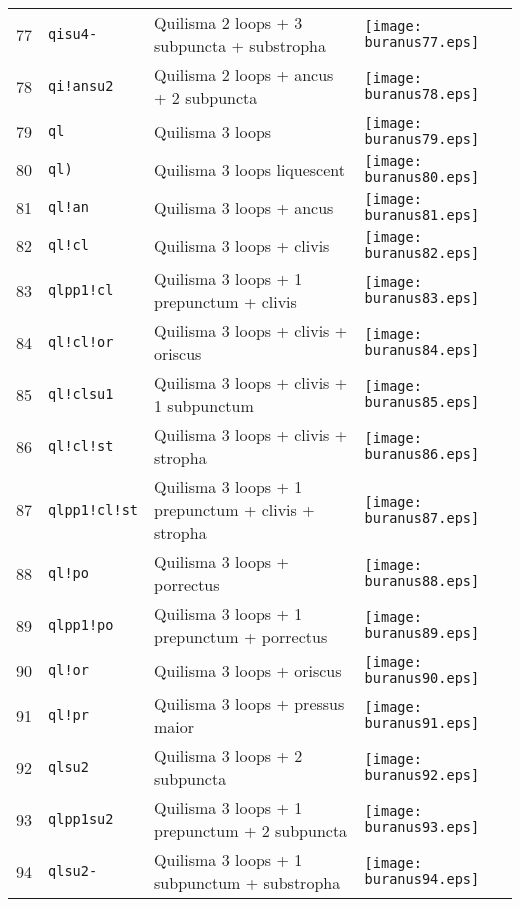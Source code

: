 \documentclass{scrarticle}
\begin{document}
\begin{longtable}{l|l|l|l}
77 & \texttt{qisu4-} & Quilisma 2 loops + 3 subpuncta + substropha & \texttt{[image: buranus77.eps]} \\
78 & \texttt{qi!ansu2} & Quilisma 2 loops + ancus + 2 subpuncta & \texttt{[image: buranus78.eps]} \\
79 & \texttt{ql} & Quilisma 3 loops & \texttt{[image: buranus79.eps]} \\
80 & \texttt{ql)} & Quilisma 3 loops liquescent & \texttt{[image: buranus80.eps]} \\
81 & \texttt{ql!an} & Quilisma 3 loops + ancus & \texttt{[image: buranus81.eps]} \\
82 & \texttt{ql!cl} & Quilisma 3 loops + clivis & \texttt{[image: buranus82.eps]} \\
83 & \texttt{qlpp1!cl} & Quilisma 3 loops + 1 prepunctum + clivis & \texttt{[image: buranus83.eps]} \\
84 & \texttt{ql!cl!or} & Quilisma 3 loops + clivis + oriscus & \texttt{[image: buranus84.eps]} \\
85 & \texttt{ql!clsu1} & Quilisma 3 loops + clivis + 1 subpunctum & \texttt{[image: buranus85.eps]} \\
86 & \texttt{ql!cl!st} & Quilisma 3 loops + clivis + stropha & \texttt{[image: buranus86.eps]} \\
87 & \texttt{qlpp1!cl!st} & Quilisma 3 loops + 1 prepunctum + clivis + stropha & \texttt{[image: buranus87.eps]} \\
88 & \texttt{ql!po} & Quilisma 3 loops + porrectus & \texttt{[image: buranus88.eps]} \\
89 & \texttt{qlpp1!po} & Quilisma 3 loops + 1 prepunctum + porrectus & \texttt{[image: buranus89.eps]} \\
90 & \texttt{ql!or} & Quilisma 3 loops + oriscus & \texttt{[image: buranus90.eps]} \\
91 & \texttt{ql!pr} & Quilisma 3 loops + pressus maior & \texttt{[image: buranus91.eps]} \\
92 & \texttt{qlsu2} & Quilisma 3 loops + 2 subpuncta & \texttt{[image: buranus92.eps]} \\
93 & \texttt{qlpp1su2} & Quilisma 3 loops + 1 prepunctum + 2 subpuncta & \texttt{[image: buranus93.eps]} \\
94 & \texttt{qlsu2-} & Quilisma 3 loops + 1 subpunctum + substropha & \texttt{[image: buranus94.eps]} \\

\end{longtable}
\end{document}
